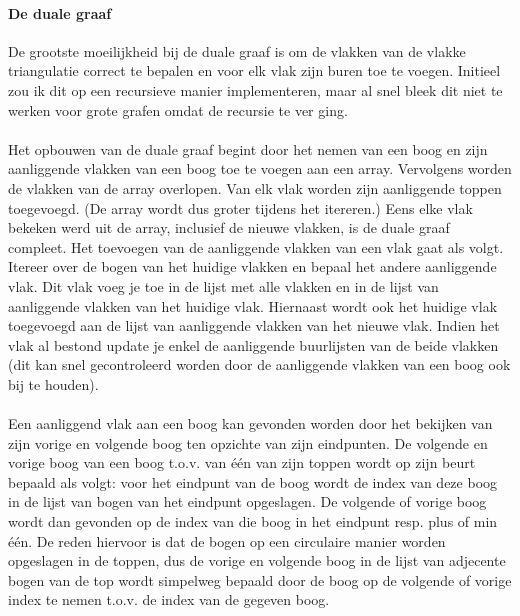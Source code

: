 \documentclass[11pt, a4paper, table]{article}
\theoremstyle{definition}
\theoremstyle{definition}
\theoremstyle{definition}
\begin{document}
\paragraph{De duale graaf}
De grootste moeilijkheid bij de duale graaf is om de vlakken van de vlakke triangulatie correct te bepalen en voor elk vlak zijn buren toe te voegen. 
Initieel zou ik dit op een recursieve manier implementeren, maar al snel bleek dit niet te werken voor grote grafen omdat de recursie te ver ging. 
\\\\Het opbouwen van de duale graaf begint door het nemen van een boog en zijn aanliggende vlakken van een boog toe te voegen aan een array. Vervolgens worden de vlakken van de array overlopen. Van elk vlak worden zijn aanliggende toppen toegevoegd. (De array wordt dus groter tijdens het itereren.) Eens elke vlak bekeken werd uit de array, inclusief de nieuwe vlakken, is de duale graaf compleet. Het toevoegen van de aanliggende vlakken van een vlak gaat als volgt. Itereer over de bogen van het huidige vlakken en bepaal het andere aanliggende vlak. Dit vlak voeg je toe in de lijst met alle vlakken en in de lijst van aanliggende vlakken van het huidige vlak. Hiernaast wordt ook het huidige vlak toegevoegd aan de lijst van aanliggende vlakken van het nieuwe vlak. Indien het vlak al bestond update je enkel de aanliggende buurlijsten van de beide vlakken (dit kan snel gecontroleerd worden door de aanliggende vlakken van een boog ook bij te houden). 
\\\\Een aanliggend vlak aan een boog kan gevonden worden door het bekijken van zijn vorige en volgende boog ten opzichte van zijn eindpunten. De volgende en vorige boog van een boog t.o.v. van \'{e}\'{e}n van zijn toppen wordt op zijn beurt bepaald als volgt: voor het eindpunt van de boog wordt de index van deze boog in de lijst van bogen van het eindpunt opgeslagen. De volgende of vorige boog wordt dan gevonden op de index van die boog in het eindpunt resp. plus of min \'{e}\'{e}n. De reden hiervoor is dat de bogen op een circulaire manier worden opgeslagen in de toppen, dus de vorige en volgende boog in de lijst van adjecente bogen van de top wordt simpelweg bepaald door de boog op de volgende of vorige index te nemen t.o.v. de index van de gegeven boog.
\end{document}
